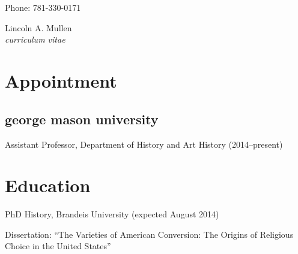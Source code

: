 \documentclass[11pt]{article}
\begin{document}
\thispagestyle{fancy}
\fancyfoot{}
\fancyhead{}
\renewcommand{\headrulewidth}{0pt}

\hfill\hfill\hfill
\hfill\hfill\hfill
\hfill\hfill\hfill
\hfill\hfill\hfill
\begin{minipage}[t]{1.4in}
   \\
  \\
  \scriptsize Phone: 781-330-0171 
\end{minipage}
\hfill
\begin{minipage}[t]{1.9in}
\end{minipage}

\vskip 0.5in

{\Large Lincoln A. Mullen}\\
\emph{curriculum vitae}\\[0.5cm]

\vskip 0.05in

\section{Appointment}
\subsection{george mason university}

Assistant Professor, Department of History and Art History (2014--present)

\section{Education}
PhD History, Brandeis University (expected August 2014)

\begingroup
    Dissertation: ``The Varieties of American Conversion: The Origins of 
    Religious Choice in the United States''
    \par
  \endgroup
\end{document}
